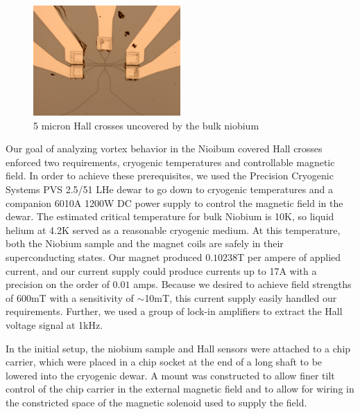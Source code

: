 \documentclass[twocolumn,aps,prl]{revtex4-1} %
\begin{document}
\begin{figure}
\includegraphics[width=0.5\textwidth]{2_cross_hallbar.png}
\caption{5 micron Hall crosses uncovered by the bulk niobium  }
\label{fig2}
\end{figure}
Our goal of analyzing vortex behavior in the Nioibum covered Hall crosses enforced two requirements, cryogenic temperatures and controllable magnetic field. In order to achieve these prerequisites, we used the Precision Cryogenic Systems PVS 2.5/51 LHe dewar to go down to cryogenic temperatures and a companion 6010A 1200W DC power supply to control the magnetic field in the dewar. The estimated critical temperature for bulk Niobium is 10K, so liquid helium at 4.2K served as a reasonable cryogenic medium. At this temperature, both the Niobium sample and the magnet coils are safely in their superconducting states. Our magnet produced $0.10238$T per ampere of applied current, and our current supply could produce currents up to 17A with a precision on the order of $0.01$ amps. Because we desired to achieve field strengths of $600$mT with a sensitivity of $\sim$10mT, this current supply easily handled our requirements. Further, we used a group of lock-in amplifiers to extract the Hall voltage signal at 1kHz.

In the initial setup, the niobium sample and Hall sensors were attached to a chip carrier, which were placed in a chip socket at the end of a long shaft to be lowered into the cryogenic dewar. A mount was constructed to allow finer tilt control of the chip carrier in the external magnetic field and to allow for wiring in the constricted space of the magnetic solenoid used to supply the field.

\end{document}
